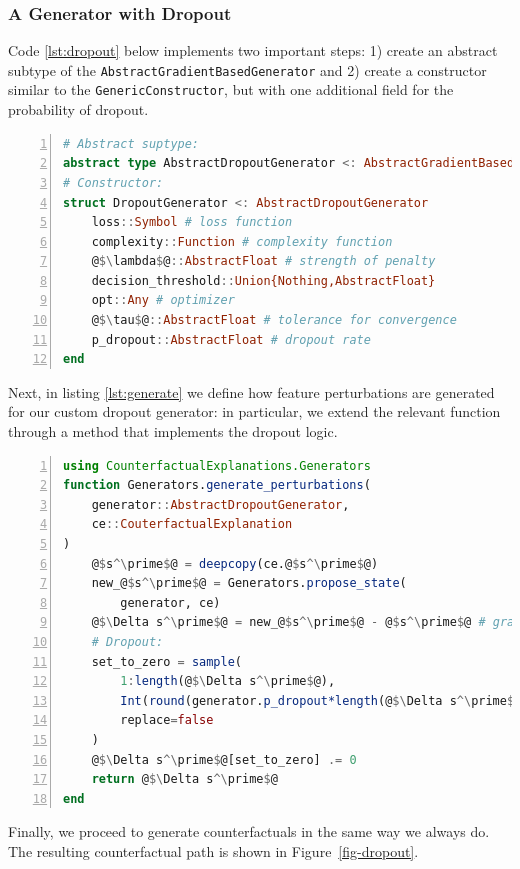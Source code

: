 \documentclass[
  letterpaper,
  DIV=11,
  numbers=noendperiod]{scrartcl}
\begin{document}
\hypertarget{a-generator-with-dropout}{%
\subsubsection{A Generator with
Dropout}\label{a-generator-with-dropout}}

Code \ref{lst:dropout} below implements two important steps: 1) create
an abstract subtype of the \texttt{AbstractGradientBasedGenerator} and
2) create a constructor similar to the \texttt{GenericConstructor}, but
with one additional field for the probability of dropout.

\begin{lstlisting}[language=Julia, escapechar=@, numbers=left, label={lst:dropout}, caption={Building a custom generator with dropout.}]
# Abstract suptype:
abstract type AbstractDropoutGenerator <: AbstractGradientBasedGenerator end
# Constructor:
struct DropoutGenerator <: AbstractDropoutGenerator
    loss::Symbol # loss function
    complexity::Function # complexity function
    @$\lambda$@::AbstractFloat # strength of penalty
    decision_threshold::Union{Nothing,AbstractFloat} 
    opt::Any # optimizer
    @$\tau$@::AbstractFloat # tolerance for convergence
    p_dropout::AbstractFloat # dropout rate
end
\end{lstlisting}

Next, in listing \ref{lst:generate} we define how feature perturbations
are generated for our custom dropout generator: in particular, we extend
the relevant function through a method that implements the dropout
logic.

\begin{lstlisting}[language=Julia, escapechar=@, numbers=left, label={lst:generate}, caption={Generating feature perturbations with dropout.}]
using CounterfactualExplanations.Generators
function Generators.generate_perturbations(
    generator::AbstractDropoutGenerator, 
    ce::CouterfactualExplanation
)
    @$s^\prime$@ = deepcopy(ce.@$s^\prime$@)
    new_@$s^\prime$@ = Generators.propose_state(
        generator, ce)
    @$\Delta s^\prime$@ = new_@$s^\prime$@ - @$s^\prime$@ # gradient step
    # Dropout:
    set_to_zero = sample(
        1:length(@$\Delta s^\prime$@),
        Int(round(generator.p_dropout*length(@$\Delta s^\prime$@))),
        replace=false
    )
    @$\Delta s^\prime$@[set_to_zero] .= 0
    return @$\Delta s^\prime$@
end
\end{lstlisting}

Finally, we proceed to generate counterfactuals in the same way we
always do. The resulting counterfactual path is shown in
Figure~\ref{fig-dropout}.
\end{document}
